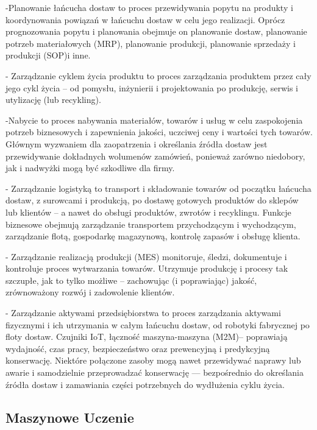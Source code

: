     -Planowanie łańcucha dostaw to proces przewidywania popytu na produkty i koordynowania powiązań w łańcuchu dostaw w celu jego realizacji. Oprócz prognozowania popytu i planowania obejmuje on planowanie dostaw, planowanie potrzeb materiałowych (MRP), planowanie produkcji, planowanie sprzedaży i produkcji (SOP)i inne. 

   - Zarządzanie cyklem życia produktu  to proces zarządzania produktem przez cały jego cykl życia – od pomysłu, inżynierii i projektowania po produkcję, serwis i utylizację (lub recykling).

    -Nabycie to proces nabywania materiałów, towarów i usług w celu zaspokojenia potrzeb biznesowych i zapewnienia jakości, uczciwej ceny i wartości tych towarów. Głównym wyzwaniem dla zaopatrzenia i określania źródła dostaw jest przewidywanie dokładnych wolumenów zamówień, ponieważ zarówno niedobory, jak i nadwyżki mogą być szkodliwe dla firmy. 

   - Zarządzanie logistyką to transport i składowanie towarów od początku łańcucha dostaw, z surowcami i produkcją, po dostawę gotowych produktów do sklepów lub klientów – a nawet do obsługi produktów, zwrotów i recyklingu. Funkcje biznesowe obejmują zarządzanie transportem przychodzącym i wychodzącym, zarządzanie flotą, gospodarkę magazynową, kontrolę zapasów i obsługę klienta. 

   - Zarządzanie realizacją produkcji (MES) monitoruje, śledzi, dokumentuje i kontroluje proces wytwarzania towarów. Utrzymuje produkcję i procesy tak szczupłe, jak to tylko możliwe – zachowując (i poprawiając) jakość, zrównoważony rozwój i zadowolenie klientów. 

   - Zarządzanie aktywami przedsiębiorstwa to proces zarządzania aktywami fizycznymi i ich utrzymania w całym łańcuchu dostaw, od robotyki fabrycznej po floty dostaw. Czujniki IoT, łączność maszyna-maszyna (M2M)– poprawiają wydajność, czas pracy, bezpieczeństwo oraz prewencyjną i predykcyjną konserwację. Niektóre połączone zasoby mogą nawet przewidywać naprawy lub awarie i samodzielnie przeprowadzać konserwację — bezpośrednio do określania źródła dostaw i zamawiania części potrzebnych do wydłużenia cyklu życia.\cite{scm2023}






\subsection{Maszynowe Uczenie}

